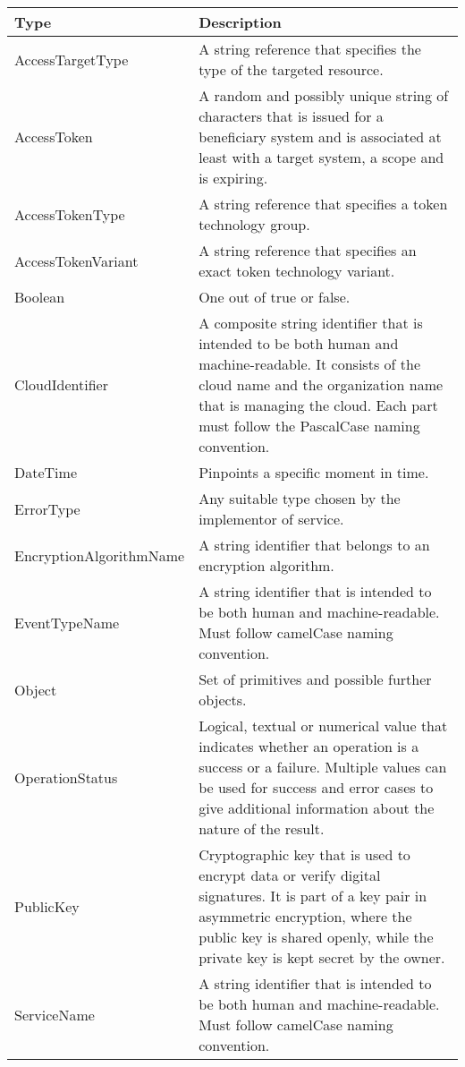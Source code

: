 \documentclass[a4paper]{arrowhead}
\newcommand{\pdef}[1]{{\textcolor{ArrowheadGrey}{#1\label{sec:model:primitives:#1}\label{sec:model:primitives:#1s}\label{sec:model:primitives:#1es}}}}
\begin{document}
\begin{table}[ht!]
\begin{tabularx}{\textwidth}{| p{5cm} | X |} \hline
\rowcolor{gray!33} Type & Description \\ \hline
\pdef{AccessTargetType} & A string reference that specifies the type of the targeted resource. \\ \hline
\pdef{AccessToken} & A random and possibly unique string of characters that is issued for a beneficiary system and is associated at least with a target system, a scope and is expiring.\\ \hline
\pdef{AccessTokenType} & A string reference that specifies a token technology group.\\ \hline
\pdef{AccessTokenVariant} & A string reference that specifies an exact token technology variant.\\ \hline
\pdef{Boolean}          & One out of true or false. \\ \hline
\pdef{CloudIdentifier} & A composite string identifier that is intended to be both human and machine-readable. It consists of the cloud name and the organization name that is managing the cloud. Each part must follow the PascalCase naming convention. \\ \hline
\pdef{DateTime}         & Pinpoints a specific moment in time. \\ \hline
\pdef{ErrorType}        & Any suitable type chosen by the implementor of service. \\ \hline
\pdef{EncryptionAlgorithmName} & A string identifier that belongs to an encryption algorithm. \\ \hline
\pdef{EventTypeName}      & A string identifier that is intended to be both human and machine-readable. Must follow camelCase naming convention. \\ \hline
\pdef{Object}           & Set of primitives and possible further objects. \\ \hline
\pdef{OperationStatus}  & Logical, textual or numerical value that indicates whether an operation is a success or a failure. Multiple values can be used for success and error cases to give additional information about the nature of the result. \\ \hline
\pdef{PublicKey} & Cryptographic key that is used to encrypt data or verify digital signatures. It is part of a key pair in asymmetric encryption, where the public key is shared openly, while the private key is kept secret by the owner. \\ \hline
\pdef{ServiceName}      & A string identifier that is intended to be both human and machine-readable. Must follow camelCase naming convention. \\ \hline

\end{tabularx}
\end{table}
\end{document}
